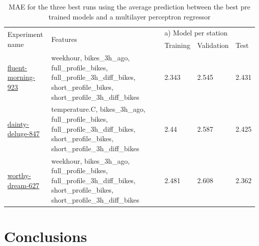 \documentclass[a4paper]{article}
\begin{document}
    \begin{table}[h]
        \begin{tabularx}{\textwidth}{|X|p{}|XXX|}
            \hline
            \multirow{2}{*}{Experiment name} &
            \multirow{2}{*}{Features} &
            \multicolumn{3}{l|}{a) Model per station} \\ \cline{3-5}
            &
            &
            \multicolumn{1}{l|}{Training} &
            \multicolumn{1}{l|}{Validation} &
            Test \\ \hline
            \href{https://wandb.ai/idegen/mlp-2021/runs/2w4l1irf?workspace=user-idegen}{fluent-morning-923} &
            weekhour, bikes\_3h\_ago, full\_profile\_bikes, full\_profile\_3h\_diff\_bikes, short\_profile\_bikes, short\_profile\_3h\_diff\_bikes &
            \multicolumn{1}{l|}{2.343} &
            \multicolumn{1}{l|}{2.545} &
            2.431 \\ \hline
            \href{https://wandb.ai/idegen/mlp-2021/runs/u7jiadho?workspace=user-idegen}{dainty-deluge-847} &
            temperature.C, bikes\_3h\_ago, full\_profile\_bikes, full\_profile\_3h\_diff\_bikes, short\_profile\_bikes, short\_profile\_3h\_diff\_bikes &
            \multicolumn{1}{l|}{2.44} &
            \multicolumn{1}{l|}{2.587} &
            2.425 \\ \hline
            \href{https://wandb.ai/idegen/mlp-2021/runs/1bzsg4s4?workspace=user-idegen}{worthy-dream-627} &
            weekhour, bikes\_3h\_ago, full\_profile\_bikes, full\_profile\_3h\_diff\_bikes, short\_profile\_bikes, short\_profile\_3h\_diff\_bikes &
            \multicolumn{1}{l|}{2.481} &
            \multicolumn{1}{l|}{2.608} &
            2.362 \\ \hline
        \end{tabularx}
        \caption{MAE for the three best runs using the average prediction between the best pre trained models and a multilayer perceptron regressor}
        \label{tbl:phase3}
    \end{table}


        \section{Conclusions}\label{sec:conclusions}
        \subsection*{}
\end{document}
